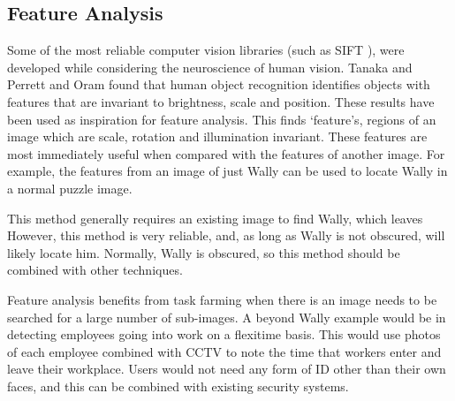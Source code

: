 \documentclass[../main.tex]{subfiles}
\begin{document}
    \subsection{Feature Analysis}
    Some of the most reliable computer vision libraries (such as SIFT \cite{sift}), were developed while considering the neuroscience of human vision.
    Tanaka\cite{tanakahv} and Perrett and Oram\cite{perretthv} found that human object recognition identifies objects with features that are invariant to brightness, scale and position.
    These results have been used as inspiration for feature analysis.
    This finds `feature's, regions of an image which are scale, rotation and illumination invariant.
    These features are most immediately useful when compared with the features of another image.
    For example, the features from an image of just Wally can be used to locate Wally in a normal puzzle image.

    This method generally requires an existing image to find Wally, which leaves 
    However, this method is very reliable, and, as long as Wally is not obscured, will likely locate him.
    Normally, Wally is obscured, so this method should be combined with other techniques.

    Feature analysis benefits from task farming when there is an image needs to be searched for a large number of sub-images.
    A beyond Wally example would be in detecting employees going into work on a flexitime basis.
    This would use photos of each employee combined with CCTV to note the time that workers enter and leave their workplace.
    Users would not need any form of ID other than their own faces, and this can be combined with existing security systems.    
\end{document}
